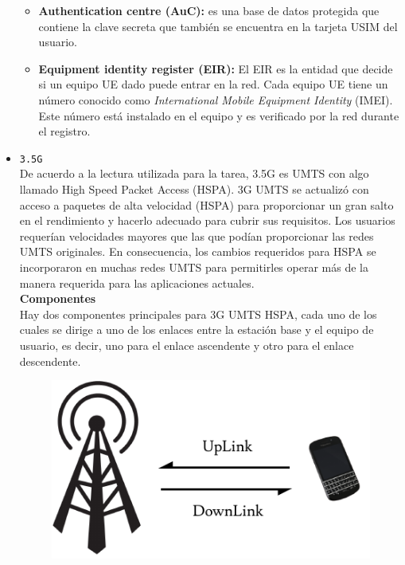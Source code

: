 \begin{itemize}
\begin{itemize}
	\item \textbf{Authentication centre (AuC): } es una base de datos protegida que contiene la clave secreta que también se encuentra en la tarjeta USIM del usuario. 
	\item \textbf{Equipment identity register (EIR):}   El EIR es la entidad que decide si un equipo UE dado puede entrar en la red. Cada equipo UE tiene un número conocido como \textit{International Mobile Equipment Identity} (IMEI). Este número está instalado en el equipo y es verificado por la red durante el registro.
	\end{itemize}
	
	\item {\color{red}\texttt{3.5G}} \\
	De acuerdo a la lectura utilizada para la tarea, 3.5G es UMTS con algo llamado High Speed Packet Access (HSPA). 3G UMTS se actualizó con acceso a paquetes de alta velocidad (HSPA) para proporcionar un gran salto en el rendimiento y hacerlo adecuado para cubrir sus requisitos. Los usuarios requerían velocidades mayores que las que podían proporcionar las redes UMTS originales. En consecuencia, los cambios requeridos para HSPA se incorporaron en muchas redes UMTS para permitirles operar más de la manera requerida para las aplicaciones actuales. \\
	
	\textbf{Componentes}\\
	Hay dos componentes principales para 3G UMTS HSPA, cada uno de los cuales se dirige a uno de los enlaces entre la estación base y el equipo de usuario, es decir, uno para el enlace ascendente y otro para el enlace descendente.
	
		\begin{figure}[ht!]
	\centering
	\includegraphics[scale=0.7]{Imagenes/arqUMTS_35.pdf}
	\end{figure}	
	

\end{itemize}
